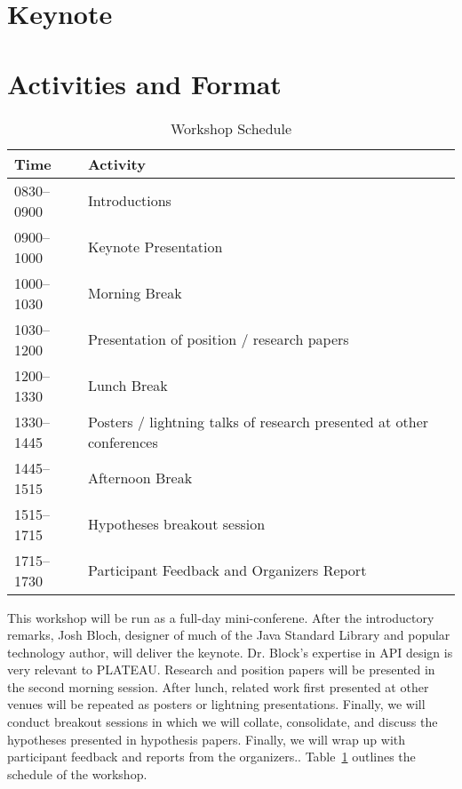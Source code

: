\documentclass{sigplanconf}
\begin{document}
\section{Keynote}

\section{Activities and Format}
\begin{table} [!t] %
\begin{tabularx}{\columnwidth}{|l|X|}
\hline
\textbf{Time}   & \textbf{Activity} \\
\hline
0830--0900    & Introductions \vspace{1mm} \\
0900--1000    & Keynote Presentation \vspace{1mm} \\
1000--1030    & Morning Break~\vspace{1mm}\\
1030--1200    & Presentation of position / research papers \vspace{1mm}\\
1200--1330    & Lunch Break~\vspace{1mm}\\
1330--1445    & Posters / lightning talks of research presented at other conferences\vspace{1mm}\\
1445--1515    & Afternoon Break~\vspace{1mm}\\
1515--1715    & Hypotheses breakout session \vspace{1mm}\\
1715--1730    & Participant Feedback and Organizers Report  \\
\end{tabularx}
\caption{Workshop Schedule}
\label{tab:schedule}
\end{table}
This workshop will be run as a full-day mini-conferene.  After the introductory remarks, Josh Bloch, designer of much of the Java Standard Library and popular technology author, will deliver the keynote. Dr. Block's expertise in API design is very relevant to PLATEAU. Research and position papers will be presented in the second morning session. After lunch, related work first presented at other venues will be repeated as posters or lightning presentations. Finally, we will conduct breakout sessions in which we will collate, consolidate, and discuss the hypotheses presented in hypothesis papers. Finally, we will wrap up with participant feedback and reports from the organizers.. Table~\ref{tab:schedule} outlines the schedule of the workshop.
\end{document}

